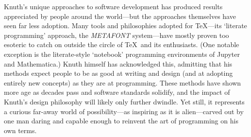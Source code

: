 \documentclass[12pt]{article}
\begin{document}
	Knuth's unique approaches to software development has produced results appreciated by people around the world---but the approaches themselves have seen far less adoption. Many tools and philosophies adopted for \TeX---its `literate programming' approach, the \textsl{METAFONT} system---have mostly proven too esoteric to catch on outside the circle of \TeX\ and its enthusiasts. (One notable exception is the literate-style `notebook' programming environments of Jupyter and Mathematica.) Knuth himself has acknowledged this, admitting that his methods expect people to be as good at writing and design (and at adopting entirely new concepts) as they are at programming. These methods have shown more age as decades pass and software standards solidify, and the impact of Knuth's design philosophy will likely only further dwindle. Yet still, it represents a curious far-away world of possibility---as inspiring as it is alien---carved out by one man daring and capable enough to reinvent the art of programming on his own terms.
\end{document}
